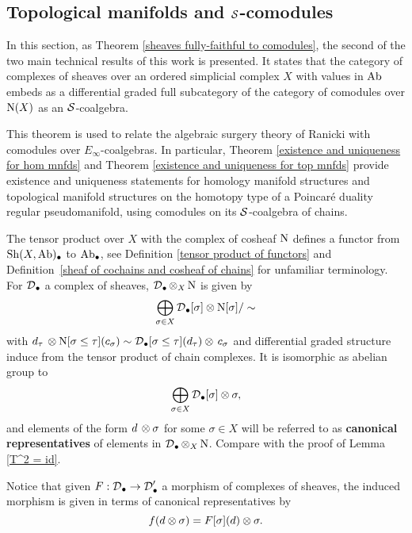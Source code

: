 \documentclass[thesis.tex]{subfiles}
\begin{document}
\subsection{Topological manifolds and $\S$-comodules}

In this section, as Theorem \ref{sheaves fully-faithful to comodules}, the second of the two main technical results of this work is presented. It states that the category of complexes of sheaves over an ordered simplicial complex $X$ with values in $\Ab$ embeds as a differential graded full subcategory of the category of comodules over $\chains(X)$ as an $\S$-coalgebra.

This theorem is used to relate the algebraic surgery theory of Ranicki with comodules over $E_\infty$-coalgebras. In particular, Theorem \ref{existence and uniqueness for hom mnfds} and Theorem \ref{existence and uniqueness for top mnfds} provide existence and uniqueness statements for homology manifold structures and topological manifold structures on the homotopy type of a Poincar\'e duality regular pseudomanifold, using comodules on its $\S$-coalgebra of chains.

\begin{notation}
The tensor product over $X$ with the complex of cosheaf $\chains$ defines a functor from $\Sh(X,\Ab)_\bullet$ to $\Ab_\bullet$, see Definition \ref{tensor product of functors} and Definition~\ref{sheaf of cochains and cosheaf of chains} for unfamiliar terminology. For $\D_\bullet$ a complex of sheaves, $\D_\bullet\tensor_X\chains$ is given by
$$\bigoplus_{\sigma\in X}\D_\bullet[\sigma]\tensor\chains[\sigma]/\sim$$
with $d_\tau\,\tensor\chains[\sigma\leq\tau](c_\sigma)\sim \D_\bullet[\sigma\leq\tau](d_\tau)\tensor\,c_\sigma$ and differential graded structure induce from the tensor product of chain complexes. It is isomorphic as abelian group to
$$\bigoplus_{\sigma\in X}\D_\bullet[\sigma]\tensor\sigma,$$ and elements of the form $d\,\tensor\sigma$ for some $\sigma\in X$ will be referred to as \textbf{canonical representatives} of elements in $\D_\bullet\tensor_X\chains$. Compare with the proof of Lemma \ref{T^2 = id}.

Notice that given $F:\D_\bullet\to\D'_\bullet$ a morphism of complexes of sheaves, the induced morphism is given in terms of canonical representatives by $$f(d\tensor\sigma)=F[\sigma](d)\tensor\sigma.$$
\end{notation}
\end{document}
